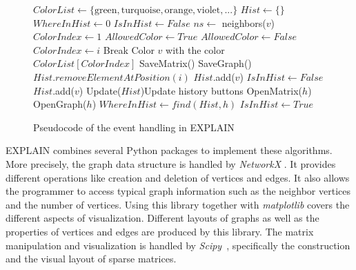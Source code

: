 \documentclass[11pt, twoside,a4paper]{book}
\begin{document}
\begin{figure}
\centering
\begin{algorithmic}[1]
\State $ColorList \gets \{\text{green}, \text{turquoise}, \text{orange}, \text{violet}, ...\}$
\State $Hist \gets \{\}$
\State $WhereInHist \gets 0$
\State $IsInHist \gets False$
\State
{}
\State $ns\gets$ neighbors($v$)
\State $ColorIndex \gets 1$
\State $AllowedColor \gets True$
\State $AllowedColor \gets False$
\EndIf
\EndFor
{}
\State $ColorIndex \gets i$
\State Break
\EndIf
\EndFor
\State Color $v$ with the color $ColorList[ColorIndex]$
\State
{}
\State SaveMatrix()
\State SaveGraph()
\EndIf
{}
\State $Hist.removeElementAtPosition(i)$
\EndFor
\State $Hist$.add($v$)
\State $IsInHist \gets False$
\Else
\State $Hist$.add($v$)
\EndIf
\State Update($Hist$)\Comment Update history buttons
\EndProcedure
\State
\State
{}
\State OpenMatrix($h$)
\State OpenGraph($h$)
\State $WhereInHist \gets find(Hist,h)$
\State $IsInHist \gets True$
\EndProcedure
\end{algorithmic}
\caption{Pseudocode of the event handling in EXPLAIN}
\label{f:alg}
\end{figure}

\mbox{EXPLAIN} combines several Python packages to implement these algorithms. More precisely, the graph data structure is handled by \textit{NetworkX} \cite{networkx2008}. It provides different operations like creation and deletion of vertices and edges. It also allows the programmer to access typical graph information such as the neighbor vertices and the number of vertices. Using this library together with \textit{matplotlib} \cite{matplotlib2007} covers the different aspects of visualization. Different layouts of graphs as well as the properties of vertices and edges are produced by this library. The matrix manipulation and visualization is handled by \textit{Scipy}~\cite{scipy2001}, specifically the construction and the visual layout of sparse matrices.
\end{document}
